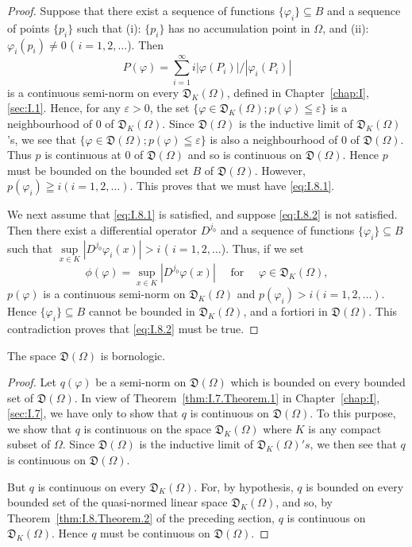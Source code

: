 \begin{proof}
 Suppose that there exist a sequence of functions $\{\varphi_i\} \subseteq B$ and a sequence of points $\{p_i\}$ such that (i): $\{p_i\}$ has no accumulation point in $\Omega$, and (ii): $\varphi_i(p_i) \neq 0$ ( $i = 1, 2, \ldots$). Then
\[
P(\varphi) = \sum\limits_{i=1} ^{\infty} i | \varphi (P_{i}) | / | \varphi_{i} (P_{i}) |
\]
is a continuous semi-norm on every $\mathfrak{D}_K(\Omega)$, defined in Chapter~\ref{chap:I}, \ref{sec:I.1}. Hence, for any $\varepsilon > 0$, the set $\{\varphi \in \mathfrak{D}_K(\Omega); p(\varphi) \leqq \varepsilon\}$ is a neighbourhood of $0$ of $\mathfrak{D}_K(\Omega)$. Since $\mathfrak{D}(\Omega)$ is the inductive limit of $\mathfrak{D}_K(\Omega)$'s, we see that $\{\varphi \in \mathfrak{D}(\Omega); p(\varphi) \leqq \varepsilon\}$ is also a neighbourhood of $0$ of $\mathfrak{D}(\Omega)$. Thus $p$ is continuous at $0$ of $\mathfrak{D}(\Omega)$ and so is continuous on $\mathfrak{D}(\Omega)$. Hence $p$ must be bounded on the bounded set $B$ of $\mathfrak{D}(\Omega)$. However, $p(\varphi_i) \geqq i (i = 1, 2, \ldots)$. This proves that we must have \eqref{eq:I.8.1}. 

We next assume that \eqref{eq:I.8.1} is satisfied, and suppose \eqref{eq:I.8.2} is not satisfied. Then there exist a differential operator $D^{j_0}$ and a sequence of functions $\{\varphi_i\} \subseteq B$ such that $\sup\limits_{x \in K} |D^{j_0} \varphi_i(x)| > i$ ( $i = 1, 2, \ldots$). Thus, if we set 
\[
\phi (\varphi) = \sup\limits_{x \in K} | D ^ {j_{0}} \varphi (x) | \quad \text{ for } \quad \varphi \in \mathfrak {D}_{K} (\Omega),
\]
$p(\varphi)$ is a continuous semi-norm on $\mathfrak{D}_K(\Omega)$ and $p(\varphi_i) > i (i = 1,2,\ldots)$. Hence $\{\varphi_i\} \subseteq B$ cannot be bounded in $\mathfrak{D}_K(\Omega)$, and a fortiori in $\mathfrak{D}(\Omega)$. This contradiction proves that \eqref{eq:I.8.2} must be true. 
\end{proof}
\begin{theorem}\label{thm:I.8.Theorem.2} The space $\mathfrak{D}(\Omega)$ is bornologic. 
\end{theorem}

\begin{proof}
 Let $q(\varphi)$ be a semi-norm on $\mathfrak{D}(\Omega)$ which is bounded on every bounded set of $\mathfrak{D}(\Omega)$. In view of Theorem~\ref{thm:I.7.Theorem.1} in Chapter~\ref{chap:I}, \ref{sec:I.7}, we have only to show that $q$ is continuous on $\mathfrak{D}(\Omega)$. To this purpose, we show that $q$ is continuous on the space $\mathfrak{D}_K(\Omega)$ where $K$ is any compact subset of $\Omega$. Since $\mathfrak{D}(\Omega)$ is the inductive limit of $\mathfrak{D}_K(\Omega)'s$, we then see that $q$ is continuous on $\mathfrak{D}(\Omega)$. 

But $q$ is continuous on every $\mathfrak{D}_K(\Omega)$. For, by hypothesis, $q$ is bounded on every bounded set of the quasi-normed linear space $\mathfrak{D}_K(\Omega)$, and so, by Theorem~\ref{thm:I.8.Theorem.2} of the preceding section, $q$ is continuous on $\mathfrak{D}_K(\Omega)$. Hence $q$ must be continuous on $\mathfrak{D}(\Omega)$. 
\end{proof}

